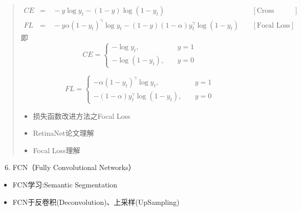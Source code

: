 \documentclass[letterpaper,10pt,english]{sphinxmanual}
\begin{document}
\begin{quote}
\begin{equation*}
\begin{split}CE & = &\ -y \log y_t - (1 - y) \log (1 - y_t) & &\ [\text{Cross Entropy Loss}] \\
FL & = &\ -y \alpha (1 - y_t)^\gamma \log y_t - (1 - y) (1 - \alpha) y_t^\gamma \log (1 - y_t) & &\ [\text{Focal Loss}]\end{split}
\end{equation*}
即
$$
CE =
\begin{cases}
- \log y_t, & &\ y=1\\
- \log (1 - y_t), & &\ y=0
\end{cases}
$$

$$
FL =
\begin{cases}
- \alpha (1 - y_t)^\gamma \log y_t, & &\ y=1\\
- (1 - \alpha) y_t^\gamma \log (1 - y_t), & &\ y=0
\end{cases}
$$\begin{itemize}
\item {} 
损失函数改进方法之Focal Loss
\begin{quote}

\end{quote}

\item {} 
RetinaNet论文理解
\begin{quote}

\end{quote}

\item {} 
Focal Loss理解
\begin{quote}

\end{quote}

\end{itemize}
\end{quote}
\begin{enumerate}
\setcounter{enumi}{5}
\item {} 
FCN（Fully Convolutional Networks）

\end{enumerate}
\begin{itemize}
\item {} 
FCN学习:Semantic Segmentation
\begin{quote}

\end{quote}

\item {} 
FCN于反卷积(Deconvolution)、上采样(UpSampling)
\begin{quote}

\end{quote}

\end{itemize}
\end{document}
